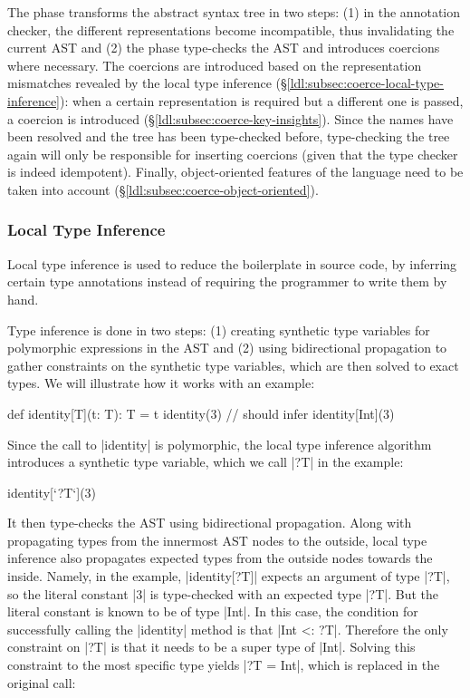 The \coerce{} phase transforms the abstract syntax tree in two steps: (1) in the annotation checker, the different representations become incompatible, thus invalidating the current AST and (2) the \coerce{} phase type-checks the AST and introduces coercions where necessary. The coercions are introduced based on the representation mismatches revealed by the local type inference (\S\ref{ldl:subsec:coerce-local-type-inference}): when a certain representation is required but a different one is passed, a coercion is introduced (\S\ref{ldl:subsec:coerce-key-insights}). Since the names have been resolved and the tree has been type-checked before, type-checking the tree again will only be responsible for inserting coercions (given that the type checker is indeed idempotent). Finally, object-oriented features of the language need to be taken into account (\S\ref{ldl:subsec:coerce-object-oriented}).

\subsubsection*{Local Type Inference}
\label{ldl:subsec:coerce-local-type-inference}

Local type inference \cite{odersky-colored-local-type-inf, pierce-local-type-inference} is used to reduce the boilerplate in source code, by inferring certain type annotations instead of requiring the programmer to write them by hand.

Type inference is done in two steps: (1) creating synthetic type variables for polymorphic expressions in the AST and (2) using bidirectional propagation to gather constraints on the synthetic type variables, which are then solved to exact types. We will illustrate how it works with an example:

\begin{lstlisting-nobreak}
 def identity[T](t: T): T = t
 identity(3) // should infer identity[Int](3)
\end{lstlisting-nobreak}

Since the call to |identity| is polymorphic, the local type inference algorithm introduces a synthetic type variable, which we call |?T| in the example:

\begin{lstlisting-nobreak}
 identity[`?T`](3)
\end{lstlisting-nobreak}

It then type-checks the AST using bidirectional propagation. Along with propagating types from the innermost AST nodes to the outside, local type inference also propagates expected types from the outside nodes towards the inside. Namely, in the example, |identity[?T]| expects an argument of type |?T|, so the literal constant |3| is type-checked with an expected type |?T|. But the literal constant is known to be of type |Int|. In this case, the condition for successfully calling the |identity| method is that |Int <: ?T|. Therefore the only constraint on |?T| is that it needs to be a super type of |Int|. Solving this constraint to the most specific type yields |?T = Int|, which is replaced in the original call:

